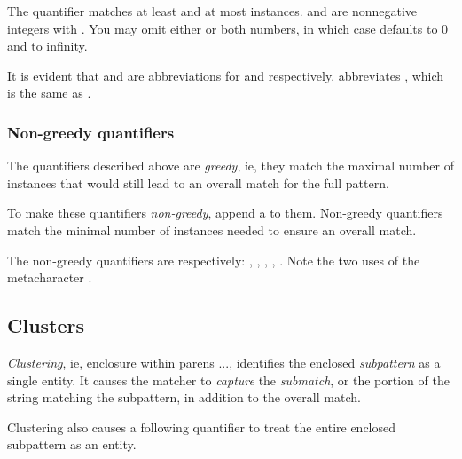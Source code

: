 {The quantifier  matches at least 
and at most  instances.   and
 are nonnegative integers with .  You may omit either or both numbers, in which case
 defaults to 0 and  to
infinity.

It is evident that \p{+} and  are abbreviations
for  and  respectively. 
\p{*} abbreviates \p{{,}}, which is the same
as .


\subsubsection{Non-greedy quantifiers}

The quantifiers described above are {\em greedy}, ie,
they match the  maximal number of instances that would
still lead to an overall match for the full pattern. 


To make these quantifiers {\em non-greedy}, append
a  to them.  Non-greedy quantifiers match 
the minimal number of instances needed to ensure an 
overall match.


The non-greedy quantifiers are respectively:
, , , , .
Note the two uses of the metacharacter .

\subsection{Clusters}

{\em Clustering}, ie, enclosure within parens
\p{(}...\p{)}, identifies the enclosed {\em subpattern}
as a single entity.  It causes the matcher to {\em capture}
the {\em submatch}, or the portion of the string
matching the subpattern, in addition to the
overall match.


Clustering also causes a following quantifier to treat
the entire enclosed subpattern as an entity.

}
